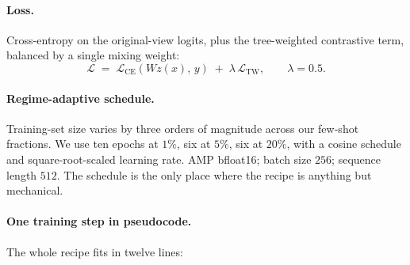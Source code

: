 ﻿\documentclass[11pt]{article}
\begin{document}
\paragraph{Loss.} Cross-entropy on the original-view logits, plus
the tree-weighted contrastive term, balanced by a single mixing
weight:
\begin{equation}
\mathcal{L} \;=\; \mathcal{L}_{\mathrm{CE}}\!\left(W z(x),\, y\right)
\;+\; \lambda\, \mathcal{L}_{\mathrm{TW}},
\qquad
\lambda = 0.5.
\end{equation}

\paragraph{Regime-adaptive schedule.} Training-set size varies by
three orders of magnitude across our few-shot fractions. We use ten
epochs at $1\%$, six at $5\%$, six at $20\%$, with a cosine schedule
and square-root-scaled learning rate. AMP bfloat16; batch size
$256$; sequence length $512$. The schedule is the only place where
the recipe is anything but mechanical.

\paragraph{One training step in pseudocode.} The whole recipe fits
in twelve lines:
\end{document}
